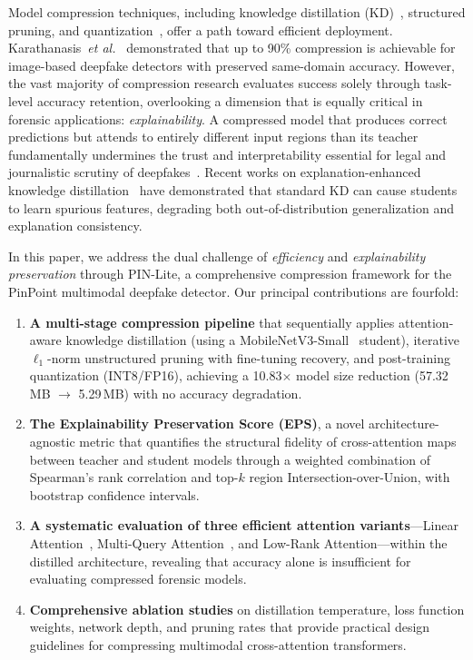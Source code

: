 \documentclass[lettersize,journal]{IEEEtran}
\begin{document}
Model compression techniques, including knowledge distillation (KD)~\cite{hinton2015distilling}, structured pruning, and quantization~\cite{jacob2018quantization}, offer a path toward efficient deployment. Karathanasis~\textit{et al.}~\cite{karathanasis2025compression} demonstrated that up to 90\% compression is achievable for image-based deepfake detectors with preserved same-domain accuracy. However, the vast majority of compression research evaluates success solely through task-level accuracy retention, overlooking a dimension that is equally critical in forensic applications: \emph{explainability}. A compressed model that produces correct predictions but attends to entirely different input regions than its teacher fundamentally undermines the trust and interpretability essential for legal and journalistic scrutiny of deepfakes~\cite{tariq2025dfp2e, malik2025pruning}. Recent works on explanation-enhanced knowledge distillation~\cite{alharbi2021xdistillation, parchami2024e2kd} have demonstrated that standard KD can cause students to learn spurious features, degrading both out-of-distribution generalization and explanation consistency.

In this paper, we address the dual challenge of \emph{efficiency} and \emph{explainability preservation} through PIN-Lite, a comprehensive compression framework for the PinPoint multimodal deepfake detector. Our principal contributions are fourfold:

\begin{enumerate}
    \item \textbf{A multi-stage compression pipeline} that sequentially applies attention-aware knowledge distillation (using a MobileNetV3-Small~\cite{howard2019mobilenetv3} student), iterative $\ell_1$-norm unstructured pruning with fine-tuning recovery, and post-training quantization (INT8/FP16), achieving a 10.83$\times$ model size reduction (57.32\,MB $\rightarrow$ 5.29\,MB) with no accuracy degradation.

    \item \textbf{The Explainability Preservation Score (EPS)}, a novel architecture-agnostic metric that quantifies the structural fidelity of cross-attention maps between teacher and student models through a weighted combination of Spearman's rank correlation and top-$k$ region Intersection-over-Union, with bootstrap confidence intervals.

    \item \textbf{A systematic evaluation of three efficient attention variants}---Linear Attention~\cite{katharopoulos2020linear}, Multi-Query Attention~\cite{shazeer2019mqa}, and Low-Rank Attention---within the distilled architecture, revealing that accuracy alone is insufficient for evaluating compressed forensic models.

    \item \textbf{Comprehensive ablation studies} on distillation temperature, loss function weights, network depth, and pruning rates that provide practical design guidelines for compressing multimodal cross-attention transformers.
\end{enumerate}
\end{document}

